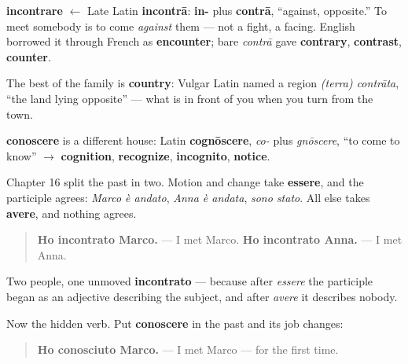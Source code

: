 \begin{cousinweb}
\textbf{incontrare} $\leftarrow$ Late Latin \textbf{incontrā}: \textbf{in-} plus \textbf{contrā}, \textquotedblleft{}against, opposite.\textquotedblright{} To meet somebody is to come \emph{against} them — not a fight, a facing. English borrowed it through French as \textbf{encounter}; bare \emph{contrā} gave \textbf{contrary}, \textbf{contrast}, \textbf{counter}.

The best of the family is \textbf{country}: Vulgar Latin named a region \emph{(terra) contrāta}, \textquotedblleft{}the land lying opposite\textquotedblright{} — what is in front of you when you turn from the town.

\textbf{conoscere} is a different house: Latin \textbf{cognōscere}, \emph{co-} plus \emph{gnōscere}, \textquotedblleft{}to come to know\textquotedblright{} $\to$ \textbf{cognition}, \textbf{recognize}, \textbf{incognito}, \textbf{notice}.
\end{cousinweb}

\begin{grammarlens}[title={Grammar Lens: which past, and the one that means \textquotedblleft{}met\textquotedblright{}}]
Chapter 16 split the past in two. Motion and change take \textbf{essere}, and the participle agrees: \emph{Marco è andato}, \emph{Anna è andata}, \emph{sono stato}. All else takes \textbf{avere}, and nothing agrees.

\begin{quote}
\textbf{Ho incontrato Marco.} — I met Marco. \textbf{Ho incontrato Anna.} — I met Anna.
\end{quote}

Two people, one unmoved \textbf{incontrato} — because after \emph{essere} the participle began as an adjective describing the subject, and after \emph{avere} it describes nobody.

Now the hidden verb. Put \textbf{conoscere} in the past and its job changes:

\begin{quote}
\textbf{Ho conosciuto Marco.} — I met Marco — for the first time.
\end{quote}
\end{grammarlens}

